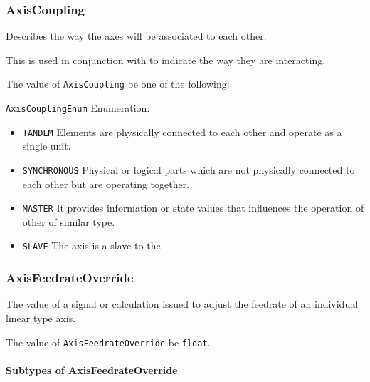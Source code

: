 \subsubsection{AxisCoupling}
\label{sec:AxisCoupling}



Describes the way the axes will be associated to each other. 
  
This is used in conjunction with  to indicate the way they are interacting.


The value of \texttt{AxisCoupling} \MUST be one of the following: 


\texttt{AxisCouplingEnum} Enumeration:

\begin{itemize}
\item \texttt{TANDEM} \newline Elements are physically connected to each other and operate as a single unit. 
\item \texttt{SYNCHRONOUS} \newline Physical or logical parts which are not physically connected to each other but are operating together. 
\item \texttt{MASTER} \newline It provides information or state values that influences the operation of other  of similar type. 
\item \texttt{SLAVE} \newline The axis is a slave to the  
\end{itemize}



\subsubsection{AxisFeedrateOverride}
\label{sec:AxisFeedrateOverride}



The value of a signal or calculation issued to adjust the feedrate of an individual linear type axis.


The value of \texttt{AxisFeedrateOverride} \MUST be \texttt{float}.


\paragraph{Subtypes of AxisFeedrateOverride}\mbox{}
\label{sec:Subtypes of AxisFeedrateOverride}

